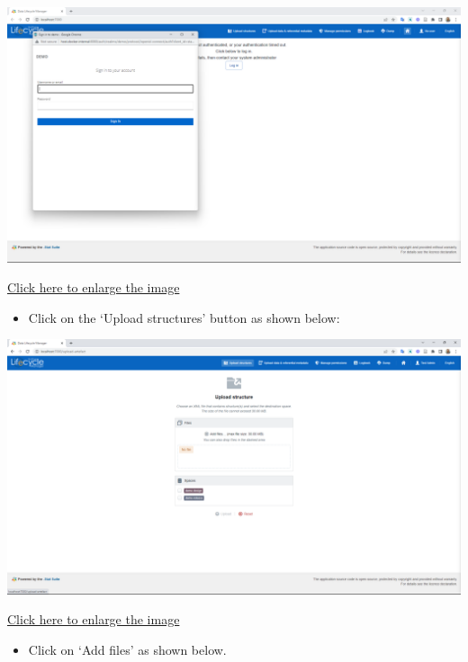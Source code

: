 \documentclass[
]{book}
\providecommand{\tightlist}{%
  \setlength{\itemsep}{0pt}\setlength{\parskip}{0pt}}
\begin{document}
\begin{center}\includegraphics[width=1\linewidth]{./images/image190} \end{center}

\href{images/image190.png}{Click here to enlarge the image}

\begin{itemize}
\tightlist
\item
  Click on the `Upload structures' button as shown below:
\end{itemize}

\begin{center}\includegraphics[width=1\linewidth]{./images/image192} \end{center}

\href{images/image192.png}{Click here to enlarge the image}

\begin{itemize}
\tightlist
\item
  Click on `Add files' as shown below.
\end{itemize}
\end{document}

